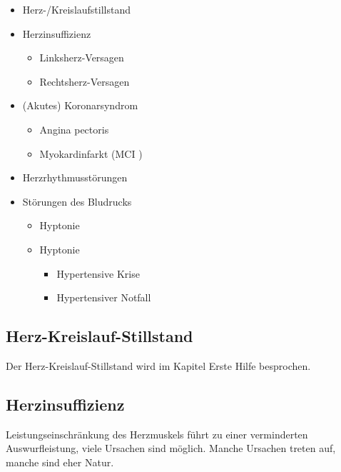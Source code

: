 \begin{itemize}
    \item Herz-/Kreislaufstillstand
    \item Herzinsuffizienz
    \begin{itemize}
        \item Linksherz-Versagen
        \item Rechtsherz-Versagen
    \end{itemize}
    \item (Akutes) Koronarsyndrom
    \begin{itemize}
        \item Angina pectoris
        \item Myokardinfarkt (MCI )
    \end{itemize}
    \item Herzrhythmusstörungen
    \item Störungen des Bludrucks
    \begin{itemize}
        \item Hyptonie
        \item Hyptonie
        \begin{itemize}
            \item Hypertensive Krise
            \item Hypertensiver Notfall
        \end{itemize}
    \end{itemize}
\end{itemize}


\subsection{Herz-Kreislauf-Stillstand}

Der Herz-Kreislauf-Stillstand wird
im Kapitel Erste Hilfe besprochen.

\subsection{Herzinsuffizienz}
\label{topic:herzinsuffizienz}


Leistungseinschränkung des Herzmuskels führt zu einer verminderten
Auswurfleistung, viele Ursachen sind möglich. Manche Ursachen treten
 auf, manche sind eher  Natur.

